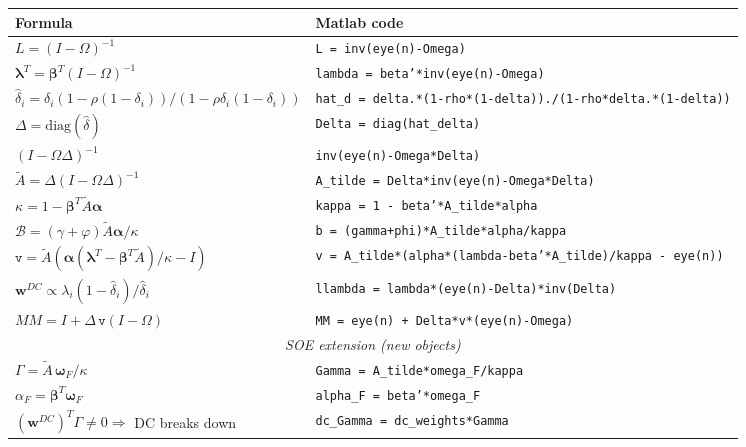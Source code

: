 \documentclass[11pt]{article}
\begin{document}
\begin{center}
\renewcommand{\arraystretch}{1.4}
\begin{tabular}{ll}
\toprule
\textbf{Formula} & \textbf{Matlab code}\\
\midrule
$L = (I-\Omega)^{-1}$ & \texttt{L = inv(eye(n)-Omega)}\\
$\boldsymbol\lambda^T = \boldsymbol\beta^T(I-\Omega)^{-1}$ & \texttt{lambda = beta'*inv(eye(n)-Omega)}\\
$\hat\delta_i = \delta_i(1-\rho(1-\delta_i))/(1-\rho\delta_i(1-\delta_i))$ & \texttt{hat\_d = delta.*(1-rho*(1-delta))./(1-rho*delta.*(1-delta))}\\
$\Delta = \mathrm{diag}(\hat\delta)$ & \texttt{Delta = diag(hat\_delta)}\\
$(I-\Omega\Delta)^{-1}$ & \texttt{inv(eye(n)-Omega*Delta)}\\
$\widetilde{A} = \Delta(I-\Omega\Delta)^{-1}$ & \texttt{A\_tilde = Delta*inv(eye(n)-Omega*Delta)}\\
$\kappa = 1 - \boldsymbol\beta^T\widetilde{A}\boldsymbol\alpha$ & \texttt{kappa = 1 - beta'*A\_tilde*alpha}\\
$\mathcal{B} = (\gamma+\varphi)\widetilde{A}\boldsymbol\alpha/\kappa$ & \texttt{b = (gamma+phi)*A\_tilde*alpha/kappa}\\
$\mathtt{v} = \widetilde{A}(\boldsymbol\alpha(\boldsymbol\lambda^T - \boldsymbol\beta^T\widetilde{A})/\kappa - I)$ & \texttt{v = A\_tilde*(alpha*(lambda-beta'*A\_tilde)/kappa - eye(n))}\\
$\mathbf{w}^{DC} \propto \lambda_i(1-\hat\delta_i)/\hat\delta_i$ & \texttt{llambda = lambda*(eye(n)-Delta)*inv(Delta)}\\
$MM = I + \Delta\,\mathtt{v}(I-\Omega)$ & \texttt{MM = eye(n) + Delta*v*(eye(n)-Omega)}\\
\midrule
\multicolumn{2}{c}{\textit{SOE extension (new objects)}}\\
\midrule
$\Gamma = \widetilde{A}\,\boldsymbol\omega_F/\kappa$ & \texttt{Gamma = A\_tilde*omega\_F/kappa}\\
$\alpha_F = \boldsymbol\beta^T\boldsymbol\omega_F$ & \texttt{alpha\_F = beta'*omega\_F}\\
$(\mathbf{w}^{DC})^T\Gamma \neq 0 \Rightarrow$ DC breaks down & \texttt{dc\_Gamma = dc\_weights*Gamma}\\
\bottomrule
\end{tabular}
\end{center}

\end{document}
